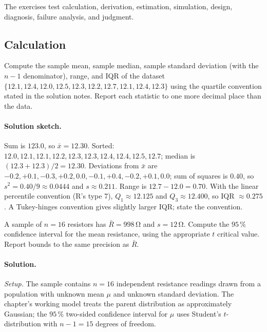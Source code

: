 The exercises test calculation, derivation, estimation, simulation,
design, diagnosis, failure analysis, and judgment.

\subsection*{Calculation}

\begin{exercise}
Compute the sample mean, sample median, sample standard deviation
(with the $n - 1$ denominator), range, and IQR of the dataset
$\{12.1, 12.4, 12.0, 12.5, 12.3, 12.2, 12.7, 12.1, 12.4, 12.3\}$
using the quartile convention stated in the solution notes. Report
each statistic to one more decimal place than the data.
\end{exercise}

\paragraph{Solution sketch.}
Sum is $123.0$, so $\bar{x} = 12.30$. Sorted:
$12.0, 12.1, 12.1, 12.2, 12.3, 12.3, 12.4, 12.4, 12.5, 12.7$;
median is $(12.3 + 12.3)/2 = 12.30$. Deviations from $\bar{x}$ are
$-0.2, +0.1, -0.3, +0.2, 0.0, -0.1, +0.4, -0.2, +0.1, 0.0$; sum of
squares is $0.40$, so $s^{2} = 0.40/9 \approx 0.0444$ and $s
\approx 0.211$. Range is $12.7 - 12.0 = 0.70$. With the linear
percentile convention (R's type 7), $Q_{1} \approx 12.125$ and
$Q_{3} \approx 12.400$, so IQR $\approx 0.275$. A Tukey-hinges
convention gives slightly larger IQR; state the convention.

\begin{exercise}
A sample of $n = 16$ resistors has $\bar{R} = 998 \,\si{\ohm}$ and
$s = 12 \,\si{\ohm}$. Compute the $95 \,\%$ confidence interval for
the mean resistance, using the appropriate $t$ critical value.
Report bounds to the same precision as $\bar{R}$.
\end{exercise}

\paragraph{Solution.}
\textit{Setup.} The sample contains $n = 16$ independent resistance
readings drawn from a population with unknown mean $\mu$ and unknown
standard deviation. The chapter's working model treats the parent
distribution as approximately Gaussian; the $95 \,\%$ two-sided
confidence interval for $\mu$ uses Student's $t$-distribution with
$n - 1 = 15$ degrees of freedom.


